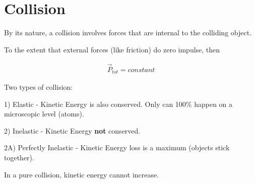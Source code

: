 \section{Collision}
	By its nature, a collision involves forces that are internal to the colliding object.

	To the extent that external forces (like friction) do zero impulse, then

	\begin{align}
		\vec{P}_{tot} = constant
	\end{align}

	Two types of collision:

	1) Elastic - Kinetic Energy is also conserved. Only can 100\% happen on a microscopic level (atoms).

	2) Inelastic - Kinetic Energy \textbf{not} conserved.

	2A) Perfectly Inelastic - Kinetic Energy loss is a maximum (objects stick together).

	In a pure collision, kinetic energy cannot increase.

